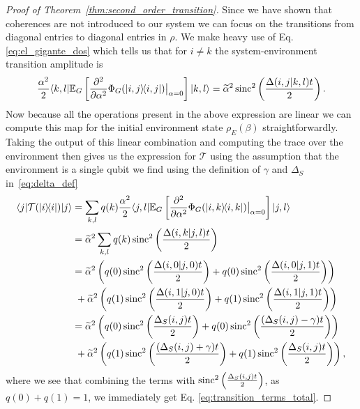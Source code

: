 \begin{proof}[Proof of Theorem~\ref{thm:second_order_transition}]
    Since we have shown that coherences are not introduced to our system we can focus on the transitions from diagonal entries to diagonal entries in $\rho$. We make heavy use of Eq. \eqref{eq:el_gigante_dos} which tells us that for $i \neq k$ the system-environment transition amplitude is
    \begin{equation}
        \frac{\alpha^2}{2}\langle k, l| \mathbb{E}_G \left[ \frac{\partial^2}{\partial \alpha^2} \Phi_G(| i, j\rangle\! \langle i,j|) \big|_{\alpha = 0} \right] |k, l\rangle = \widetilde{\alpha}^2 \operatorname{sinc}^2 \left( \frac{\Delta(i,j | k, l) t}{2} \right). 
    \end{equation}
    Now because all the operations present in the above expression are linear we can compute this map for the initial environment state $\rho_E(\beta)$ straightforwardly. Taking the output of this linear combination and computing the trace over the environment then gives us the expression for $\mathcal{T}$ using the assumption that the environment is a single qubit we find using the definition of $\gamma$ and $\Delta_S$ in~\eqref{eq:delta_def}
    \begin{align}
        \langle j| \mathcal{T}(| i\rangle\! \langle i|) |j\rangle &= \sum_{k, l} q(k) \frac{\alpha^2}{2}\langle j, l| \mathbb{E}_G \left[ \frac{\partial^2}{\partial \alpha^2} \Phi_G(| i, k\rangle\! \langle i,k|) \big|_{\alpha = 0} \right] |j, l\rangle \\
        &= \widetilde{\alpha}^2 \sum_{k, l} q(k) \operatorname{sinc}^2 \left(\frac{\Delta(i, k | j , l) t}{2} \right) \\
        &= \widetilde{\alpha}^2 \left(q(0) \operatorname{sinc}^2 \left(\frac{\Delta(i, 0 | j , 0) t}{2} \right) + q(0) \operatorname{sinc}^2 \left(\frac{\Delta(i, 0 | j , 1) t}{2} \right) \right) \nonumber \\
        & ~+ \widetilde{\alpha}^2 \left(q(1) \operatorname{sinc}^2 \left(\frac{\Delta(i, 1 | j , 0) t}{2} \right) + q(1) \operatorname{sinc}^2 \left(\frac{\Delta(i, 1 | j , 1) t}{2} \right) \right) \\
        &= \widetilde{\alpha}^2 \left(q(0) \operatorname{sinc}^2 \left(\frac{\Delta_S(i,j) t}{2} \right) + q(0) \operatorname{sinc}^2 \left(\frac{(\Delta_S(i,j) - \gamma) t}{2} \right) \right) \nonumber \\
        & ~+ \widetilde{\alpha}^2 \left(q(1) \operatorname{sinc}^2 \left(\frac{(\Delta_S(i, j) + \gamma) t}{2} \right) + q(1) \operatorname{sinc}^2 \left(\frac{\Delta_S(i,j) t}{2} \right) \right),
    \end{align}
    where we see that combining the terms with $\operatorname{sinc}^2 \left(\frac{\Delta_S(i,j) t}{2} \right)$, as $q(0) + q(1) = 1$, we immediately get Eq. \eqref{eq:transition_terms_total}. 


\end{proof}
